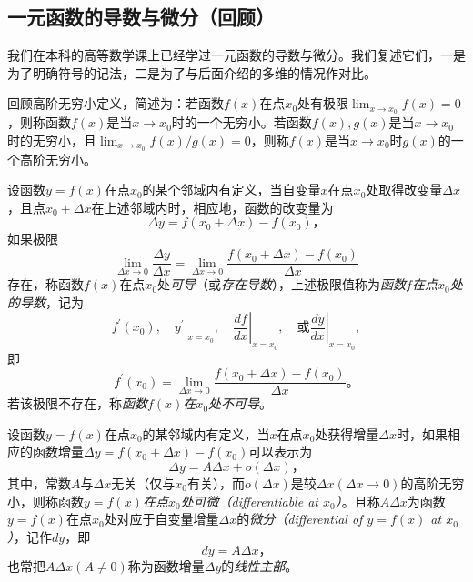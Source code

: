 \documentclass[../main.tex]{subfiles}
\begin{document}
\subsection{一元函数的导数与微分（回顾）}
我们在本科的高等数学课上已经学过一元函数的导数与微分。我们复述它们，一是为了明确符号的记法，二是为了与后面介绍的多维的情况作对比。

回顾高阶无穷小定义，简述为：若函数$f\left(x\right)$在点$x_0$处有极限$\lim_{x\to x_0}f\left(x\right)=0$，则称函数$f\left(x\right)$是当$x\to x_0$时的一个无穷小。若函数$f\left(x\right),g\left(x\right)$是当$x\to x_0$时的无穷小，且$\lim_{x\to x_0}f\left(x\right)/g\left(x\right)=0$，则称$f\left(x\right)$是当$x\to x_0$时$g\left(x\right)$的一个高阶无穷小。

\begin{definition}[一元函数的导数]\label{def:II.4.7}\cite[定义2.1.1]{华工高数2009上}
    设函数$y=f\left(x\right)$在点$x_0$的某个邻域内有定义，当自变量$x$在点$x_0$处取得改变量$\Delta x$，且点$x_0+\Delta x$在上述邻域内时，相应地，函数的改变量为
    \[
        \Delta y=f\left(x_0+\Delta x\right)-f\left(x_0\right)\text{，}
    \]
    如果极限
    \[
        \lim_{\Delta x\to 0}\frac{\Delta y}{\Delta x}=\lim_{\Delta x\to 0}\frac{f\left(x_0+\Delta x\right)-f\left(x_0\right)}{\Delta x}
    \]
    存在，称函数$f\left(x\right)$在点$x_0$处\emph{可导}（或\emph{存在导数}），上述极限值称为\emph{函数$f$在点$x_0$处的导数}，记为
    \[f^\prime\left(x_0\right),\quad\left.y^\prime\right|_{x=x_0},\quad\left.\frac{df}{dx}\right|_{x=x_0},\quad\text{或}\left.\frac{dy}{dx}\right|_{x=x_0},
    \]
    即
    \[
        f^\prime\left(x_0\right)=\lim_{\Delta x\to 0}\frac{f\left(x_0+\Delta x\right)-f\left(x_0\right)}{\Delta x}\text{。}
    \]
    若该极限不存在，称\emph{函数$f\left(x\right)$在$x_0$处不可导}。
\end{definition}

\begin{definition}[一元函数的微分]\label{def:II.4.8}\cite[定义2.5.1]{华工高数2009上}
    设函数$y=f\left(x\right)$在点$x_0$的某邻域内有定义，当$x$在点$x_0$处获得增量$\Delta x$时，如果相应的函数增量$\Delta y=f\left(x_0+\Delta x\right)-f\left(x_0\right)$可以表示为
    \[\Delta y=A\Delta x+o\left(\Delta x\right)\text{，}
    \]
    其中，常数$A$与$\Delta x$无关（仅与$x_0$有关），而$o\left(\Delta x\right)$是较$\Delta x\left(\Delta x\to 0\right)$的高阶无穷小，则称函数$y=f\left(x\right)$\emph{在点$x_0$处可微（differentiable at $x_0$）}。且称$A\Delta x$为函数$y=f\left(x\right)$在点$x_0$处对应于自变量增量$\Delta x$的\emph{微分（differential of $y=f\left(x\right)$ at $x_0$）}，记作$dy$，即
    \[
        dy=A\Delta x\text{，}
    \]
    也常把$A\Delta x\left(A\neq 0\right)$称为函数增量$\Delta y$的\emph{线性主部}。
\end{definition}
\end{document}
